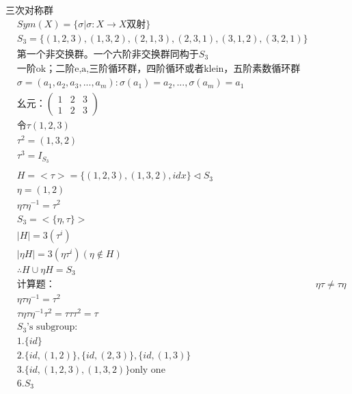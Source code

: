 \documentclass[12pt, a4paper]{article}  %
\begin{document}
三次对称群
\begin{align}
    &Sym(X)=\{\sigma |\sigma :X\rightarrow X\text{双射}\}\\
    &S_3=\{(1,2,3),(1,3,2),(2,1,3),(2,3,1),(3,1,2),(3,2,1)\}\\
    &\text{第一个非交换群。一个六阶非交换群同构于}S_3\\
    &\text{一阶ok；二阶{e,a},三阶循环群，四阶循环或者klein，五阶素数循环群}\\
    &\sigma=(a_1,a_2,a_3,...,a_m):\sigma(a_1)=a_2,...,\sigma(a_m)=a_1\\
    & \text{幺元：}\begin{pmatrix}
        1&2&3\\
        1&2&3
    \end{pmatrix}\\
    &\text{令}\tau (1,2,3)\\
    &\tau ^2=(1,3,2)\\
    &\tau ^3=I_{S_3}\\
    &\\
    &H=<\tau>=\{(1,2,3),(1,3,2),idx\} \lhd S_3\\
    & \eta =(1,2)\\
    &\eta \tau \eta^{-1}=\tau^2\\
    &S_3=<\{\eta,\tau\}>\\
    &|H|=3(\tau^i)\\
    &|\eta H|=3(\eta\tau^i)(\eta\notin H)\\
    &\therefore H\cup \eta H=S_3\\
    &\text{计算题：}
    &\eta \tau \neq \tau \eta\\
    &\eta \tau \eta^{-1}=\tau^2\\
    &\tau \eta \tau\eta^{-1}\tau^2=\tau \tau \tau^2=\tau\\
    &S_3\text{'s subgroup}:\\
    &1.\{id\}\\
    &2.\{id,(1,2)\},\{id,(2,3)\},\{id,(1,3)\}\\
    &3. \{id,(1,2,3),(1,3,2)\}\text{only one}\\
    &6. S_3
\end{align}
\end{document}
